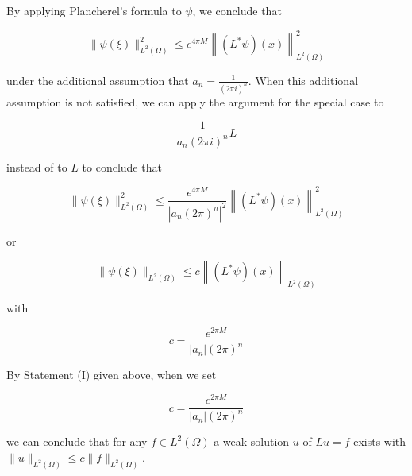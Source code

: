 \documentclass[10pt]{article}
\begin{document}
By applying Plancherel's formula to $\psi$, we conclude that

$$
\|\psi(\xi)\|_{L^{2}(\Omega)}^{2} \leq e^{4 \pi M}\left\|\left(L^{*} \psi\right)(x)\right\|_{L^{2}(\Omega)}^{2}
$$

under the additional assumption that $a_{n}=\frac{1}{(2 \pi i)^{n}}$. When this additional assumption is not satisfied, we can apply the argument for the special case to

$$
\frac{1}{a_{n}(2 \pi i)^{n}} L
$$

instead of to $L$ to conclude that

$$
\|\psi(\xi)\|_{L^{2}(\Omega)}^{2} \leq \frac{e^{4 \pi M}}{\left|a_{n}(2 \pi)^{n}\right|^{2}}\left\|\left(L^{*} \psi\right)(x)\right\|_{L^{2}(\Omega)}^{2}
$$

or

$$
\|\psi(\xi)\|_{L^{2}(\Omega)} \leq c\left\|\left(L^{*} \psi\right)(x)\right\|_{L^{2}(\Omega)}
$$

with

$$
c=\frac{e^{2 \pi M}}{\left|a_{n}\right|(2 \pi)^{n}}
$$

By Statement (I) given above, when we set

$$
c=\frac{e^{2 \pi M}}{\left|a_{n}\right|(2 \pi)^{n}}
$$

we can conclude that for any $f \in L^{2}(\Omega)$ a weak solution $u$ of $L u=f$ exists with $\|u\|_{L^{2}(\Omega)} \leq c\|f\|_{L^{2}(\Omega)}$.
\end{document}
